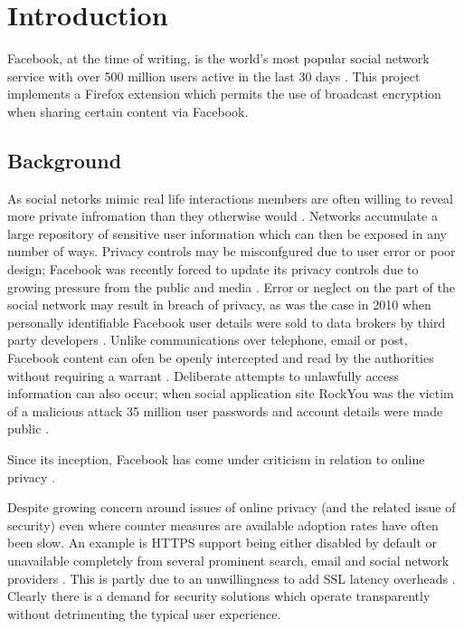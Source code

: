 \chapter{Introduction}\label{ch:introduction}

Facebook, at the time of writing, is the world's most popular social network service with over 500 million users active in the last 30 days \cite{fb-factsheet}. This project implements a Firefox extension which permits the use of broadcast encryption when sharing certain content via Facebook.

\section{Background}

As social netorks mimic real life interactions members are often willing to reveal more private infromation than they otherwise would \cite{}. Networks accumulate a large repository of sensitive user information which can then be exposed in any number of ways. Privacy controls may be misconfgured due to user error or poor design; Facebook was recently forced to update its privacy controls due to growing pressure from the public and media \cite{fb-priv}. Error or neglect on the part of the social network may result in breach of privacy, as was the case in 2010 when personally identifiable Facebook user details were sold to data brokers by third party developers \cite{}. Unlike communications over telephone, email or post, Facebook content can ofen be openly intercepted and read by the authorities without requiring a warrant \cite{}. Deliberate attempts to unlawfully access information can also occur; when social application site RockYou was the victim of a malicious attack 35 million user passwords and account details were made public \cite{}.

Since its inception, Facebook has come under criticism in relation to online privacy \cite{fb-cipc}. 





Despite growing concern around issues of online privacy (and the related issue of security) even where counter measures are available adoption rates have often been slow. An example is HTTPS support being either disabled by default or unavailable completely from several prominent search, email and social network providers \cite{}. This is partly due to an unwillingness to add SSL latency overheads \cite{}. Clearly there is a demand for security solutions which operate transparently without detrimenting the typical user experience.
  
